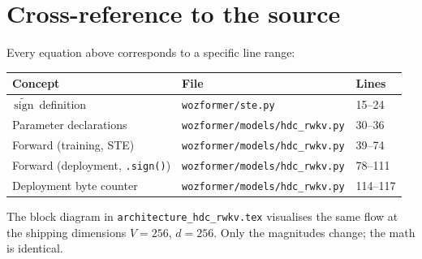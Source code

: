 \documentclass[11pt,a4paper]{article}
\newcommand{\stesign}{\,\widetilde{\text{sign}}\,}
\begin{document}
\section{Cross-reference to the source}

Every equation above corresponds to a specific line range:

\begin{tabular}{@{}lll@{}}
\toprule
Concept & File & Lines \\
\midrule
$\stesign$ definition           & \texttt{wozformer/ste.py}                   & 15--24 \\
Parameter declarations          & \texttt{wozformer/models/hdc\_rwkv.py}      & 30--36 \\
Forward (training, STE)         & \texttt{wozformer/models/hdc\_rwkv.py}      & 39--74 \\
Forward (deployment, \verb|.sign()|) & \texttt{wozformer/models/hdc\_rwkv.py} & 78--111 \\
Deployment byte counter         & \texttt{wozformer/models/hdc\_rwkv.py}      & 114--117 \\
\bottomrule
\end{tabular}

\bigskip
\noindent
The block diagram in \texttt{architecture\_hdc\_rwkv.tex} visualises the
same flow at the shipping dimensions $V{=}256$, $d{=}256$. Only the magnitudes
change; the math is identical.
\end{document}
